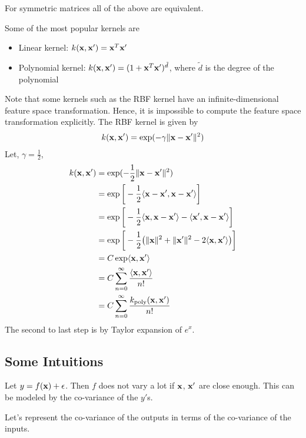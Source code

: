 For symmetric matrices all of the above are equivalent. 

Some of the most popular kernels are
\begin{itemize}
	\item Linear kernel: $k({\mathbf{x}}, {\mathbf{x}}') = {\mathbf{x}}^T{\mathbf{x}}'$
	\item Polynomial kernel: $k({\mathbf{x}}, {\mathbf{x}}') = (1+{\mathbf{x}}^T{\mathbf{x}}')^{\tilde{d}}$, where $\tilde{d}$ is the degree of the polynomial
\end{itemize}

Note that some kernels such as the RBF kernel have an infinite-dimensional feature space transformation. Hence, it is impossible to compute the feature space transformation explicitly. The RBF kernel is given by
\begin{align*}
	k({\mathbf{x}}, {\mathbf{x}}') = \exp(-\gamma \|{\mathbf{x}}-{\mathbf{x}}'\|^2)
\end{align*}
Let, $\gamma=\frac{1}{2}$, 
\begin{align*}
	k({\mathbf{x}}, {\mathbf{x}}') &= \exp(-\frac{1}{2} \|{\mathbf{x}}-{\mathbf{x}}'\|^2)\\
				   &= \exp\bigg[-\frac{1}{2} \langle {\mathbf{x}}-{\mathbf{x}}', {\mathbf{x}}-{\mathbf{x}}' \rangle \bigg]\\
				   &= \exp\bigg[-\frac{1}{2} \langle {\mathbf{x}}, {\mathbf{x}}-{\mathbf{x}}' \rangle-\langle {\mathbf{x}}', {\mathbf{x}}-{\mathbf{x}}' \rangle\bigg]\\
				   &= \exp\bigg[-\frac{1}{2} \big(\|{\mathbf{x}}\|^2+\|{\mathbf{x}}'\|^2-2 \langle {\mathbf{x}}, {\mathbf{x}}' \rangle\big) \bigg]\\
				   &= C\exp\langle {\mathbf{x}}, {\mathbf{x}}' \rangle\\
				   &= C\sum_{n=0}^\infty \frac{\langle {\mathbf{x}}, {\mathbf{x}}' \rangle}{n!}\\
				   &= C\sum_{n=0}^\infty \frac{k_{\textrm{poly}}({\mathbf{x}}, {\mathbf{x}}')}{n!}\\
\end{align*}
The second to last step is by Taylor expansion of $e^x$.

\subsection{Some Intuitions}

Let $y=f({\mathbf{x}})+\epsilon$. Then $f$ does not vary a lot if ${\mathbf{x}}$, ${\mathbf{x}}'$ are close enough. This can be modeled by the co-variance of the $y'$s.

Let's represent the co-variance of the outputs in terms of the co-variance of the inputs. 

